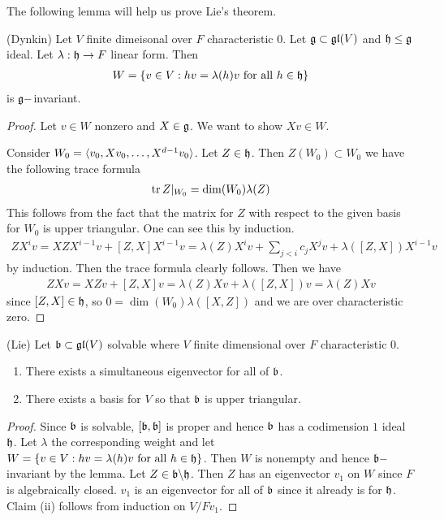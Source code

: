 \documentclass[12pt]{article}
\begin{document}
The following lemma will help us prove Lie's theorem.
\begin{lemma}
    (Dynkin) Let $V$ finite dimeisonal over $F$ characteristic $0$. Let $\mathfrak{g}\subset \operatorname{\mathfrak{gl}}(V)$ and $\mathfrak{h}\leq \mathfrak{g}$ ideal.
    Let $\lambda:\mathfrak{h}\to F$ linear form. Then \begin{align*}
        W = \{v\in V: hv = \lambda(h)v\text{ for all }h\in\mathfrak{h}\}
    \end{align*} is $\mathfrak{g}-$invariant.
\end{lemma}
\begin{proof}
    Let $v\in W$ nonzero and $X\in\mathfrak{g}$. We want to show $Xv\in W$.
    
    Consider $W_0 = \langle{v_0,Xv_0,\dots, X^{d-1}v_0}\rangle$. Let $Z\in\mathfrak{h}$. Then $Z(W_0)\subset W_0$ we have the following trace formula \begin{align*}
        \operatorname{tr} Z\vert_{W_0} = \dim(W_0)\lambda(Z)
    \end{align*} This follows from the fact that the matrix for $Z$ with respect to the given basis for $W_0$ is upper triangular. One can see this by induction.
    \begin{align*}
        ZX^iv = XZX^{i-1}v + [Z,X]X^{i-1}v = \lambda(Z)X^iv + \sum_{j<i}c_jX^jv +\lambda([Z,X])X^{i-1}v
    \end{align*} by induction. Then the trace formula clearly follows. Then we have \begin{align*}
        ZXv = XZv + [Z,X]v = \lambda(Z)Xv + \lambda([Z,X])v  = \lambda(Z)Xv
    \end{align*} since $[Z,X]\in\mathfrak{h}$, so $0 = \dim(W_0)\lambda([X,Z])$ and we are over characteristic zero.
\end{proof}

\begin{theorem}
    (Lie) Let $\mathfrak{b}\subset \mathfrak{gl}(V)$ solvable where $V$ finite dimensional over $F$ characteristic $0$. \begin{enumerate}
        \item There exists a simultaneous eigenvector for all of $\mathfrak{b}$.
        \item There exists a basis for $V$ so that $\mathfrak{b}$ is upper triangular.
    \end{enumerate}
\end{theorem}
\begin{proof}
    Since $\mathfrak{b}$ is solvable, $[\mathfrak{b},\mathfrak{b}]$ is proper and hence $\mathfrak{b}$ has a codimension $1$ ideal $\mathfrak{h}$.
    Let $\lambda$ the corresponding weight and let $W = \{v\in V: hv = \lambda(h)v\text{ for all }h\in\mathfrak{h}\}$.
    Then $W$ is nonempty and hence $\mathfrak{b}-$invariant by the lemma. Let $Z\in \mathfrak{b}\backslash\mathfrak{h}$.
    Then $Z$ has an eigenvector $v_1$ on $W$ since $F$ is algebraically closed. $v_1$ is an eigenvector for all of $\mathfrak{b}$ since it already is for $\mathfrak{h}$.
    Claim (ii) follows from induction on $V/Fv_1$.
\end{proof}
\end{document}
